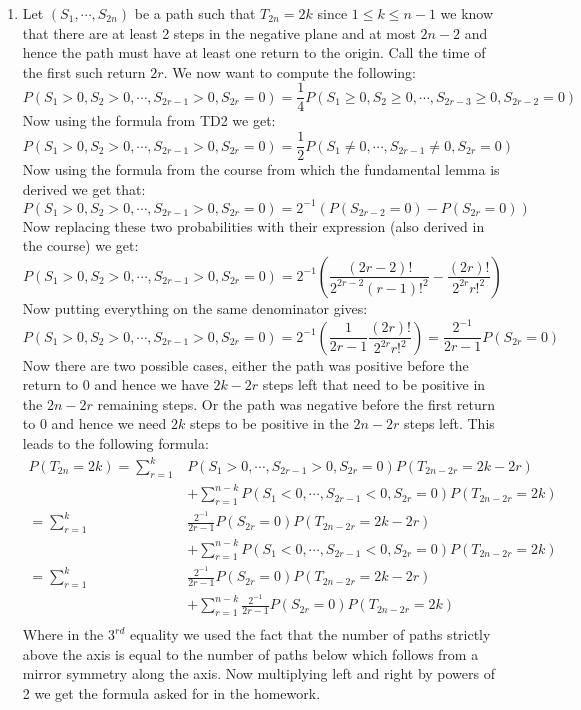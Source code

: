 \documentclass[10pt,a4paper]{article}
\begin{document}
\begin{enumerate}
\item Let $(S_1, \cdots, S_{2n})$ be a path such that $T_{2n} = 2k$ since $ 1 \leq k \leq n - 1$ we know that there are at least 2 steps in the negative plane and at most $2n-2$ and hence the path must have at least one return to the origin. Call the time of the first such return $2r$. We now want to compute the following:
\[
P(S_1 > 0, S_2 > 0, \cdots, S_{2r-1} > 0, S_{2r} = 0) = \frac{1}{4} P(S_1 \geq 0, S_2 \geq 0, \cdots, S_{2r - 3} \geq 0, S_{2r - 2} = 0)
\]
Now using the formula from TD2 we get:
\[
P(S_1 > 0, S_2 > 0, \cdots, S_{2r-1} > 0, S_{2r} = 0) = \frac{1}{2} P(S_1 \neq 0, \cdots, S_{2r - 1} \neq 0, S_{2r} = 0)
\]
Now using the formula from the course from which the fundamental lemma is derived we get that:
\[
P(S_1 > 0, S_2 > 0, \cdots, S_{2r-1} > 0, S_{2r} = 0) = 2^{-1} (P(S_{2r  -2} = 0) - P(S_{2r} = 0))
\]
Now replacing these two probabilities with their expression (also derived in the course) we get:
\[
P(S_1 > 0, S_2 > 0, \cdots, S_{2r-1} > 0, S_{2r} = 0) = 2^{-1}\left( \frac{(2r - 2)!}{2^{2r - 2} (r - 1)!^2} - \frac{(2r)!}{2^{2r} r!^2} \right)
\]
Now putting everything on the same denominator gives:
\[
P(S_1 > 0, S_2 > 0, \cdots, S_{2r-1} > 0, S_{2r} = 0)  = 2^{-1}\left( \frac{1}{2r - 1} \frac{(2r)!}{2^{2r} r!^2} \right) = \frac{2^{-1}}{2r - 1} P(S_{2r} = 0)
\]
Now there are two possible cases, either the path was positive before the return to 0 and hence we have $2k - 2r$ steps left that need to be positive in the $2n - 2r$ remaining steps. Or the path was negative before the first return to 0 and hence we need $2k$ steps to be positive in the $2n - 2r$ steps left. This leads to the following formula:
\begin{align*}
P(T_{2n} = 2k) = \sum_{r = 1}^k &P(S_1 > 0, \cdots, S_{2r - 1} > 0, S_{2r} = 0) P(T_{2n - 2r} = 2k - 2r) \\
&+ \sum_{r = 1}^{n - k} P(S_1 < 0, \cdots, S_{2r - 1} < 0, S_{2r} = 0) P(T_{2n - 2r} = 2k)\\
= \sum_{r = 1}^k &\frac{2^{-1}}{2r - 1} P(S_{2r} = 0) P(T_{2n - 2r} = 2k - 2r) \\
&+ \sum_{r = 1}^{n - k} P(S_1 < 0, \cdots, S_{2r - 1} < 0, S_{2r} = 0) P(T_{2n - 2r} = 2k)\\
= \sum_{r = 1}^k &\frac{2^{-1}}{2r - 1} P(S_{2r} = 0) P(T_{2n - 2r} = 2k - 2r) \\
&+ \sum_{r = 1}^{n - k} \frac{2^{-1}}{2r - 1} P(S_{2r} = 0) P(T_{2n - 2r} = 2k)\\
\end{align*}
Where in the $3^{rd}$ equality we used the fact that the number of paths strictly above the axis is equal to the number of paths below which follows from a mirror symmetry along the axis. Now multiplying left and right by powers of 2 we get the formula asked for in the homework.


\end{enumerate}
\end{document}
